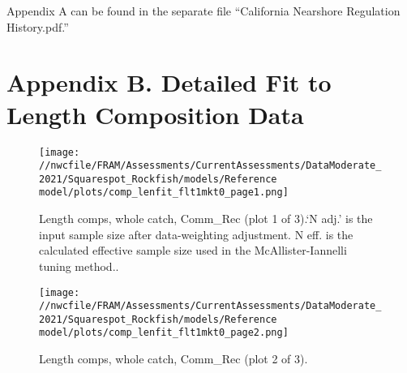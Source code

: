 \documentclass[11pt,
  english,
  a4paper,
]{article}
\begin{document}
\leavevmode\tagmcend\tagstructend


Appendix A can be found in the separate file ``California Nearshore Regulation History.pdf.''

\leavevmode\tagmcend\tagstructend\par


\hypertarget{appendix-b.-detailed-fit-to-length-composition-data}{%
\section{Appendix B. Detailed Fit to Length Composition Data}\label{appendix-b.-detailed-fit-to-length-composition-data}}

\leavevmode\tagmcend\tagstructend


\begin{figure}
\centering
\texttt{[image: //nwcfile/FRAM/Assessments/CurrentAssessments/DataModerate\_2021/Squarespot\_Rockfish/models/Reference model/plots/comp\_lenfit\_flt1mkt0\_page1.png]}
\caption{Length comps, whole catch, Comm\_Rec (plot 1 of 3).`N adj.' is the input sample size after data-weighting adjustment. N eff. is the calculated effective sample size used in the McAllister-Iannelli tuning method..\label{fig:comp_lenfit_flt1mkt0_page1}}
\end{figure}

\tagmcend\tagstructend


\begin{figure}
\centering
\texttt{[image: //nwcfile/FRAM/Assessments/CurrentAssessments/DataModerate\_2021/Squarespot\_Rockfish/models/Reference model/plots/comp\_lenfit\_flt1mkt0\_page2.png]}
\caption{Length comps, whole catch, Comm\_Rec (plot 2 of 3).\label{fig:comp_lenfit_flt1mkt0_page2}}
\end{figure}

\tagmcend\tagstructend
\end{document}
